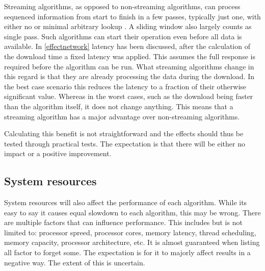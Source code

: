\documentclass[11pt,a4paper]{report}
\begin{document}
Streaming algorithms, as opposed to non-streaming algorithms, can process sequenced information from start to finish in a few passes, typically just one, with either no or minimal arbitrary lookup \cite{streamalg}. A sliding window also largely counts as single pass. Such algorithms can start their operation even before all data is available. In \ref{effectnetwork} latency has been discussed, after the calculation of the download time a fixed latency was applied. This assumes the full response is required before the algorithm can be run. What streaming algorithms change in this regard is that they are already processing the data during the download. In the best case scenario this reduces the latency to a fraction of their otherwise significant value. Whereas in the worst cases, such as the download being faster than the algorithm itself, it does not change anything. This means that a streaming algorithm has a major advantage over non-streaming algorithms.

Calculating this benefit is not straightforward and the effects should thus be tested through practical tests. The expectation is that there will be either no impact or a positive improvement.

\subsection{System resources}

System resources will also affect the performance of each algorithm. While its easy to say it causes equal slowdown to each algorithm, this may be wrong. There are multiple factors that can influence performance. This includes but is not limited to: processor spreed, processor cores, memory latency, thread scheduling, memory capacity, processor architecture, etc. It is almost guaranteed when listing all factor to forget some. The expectation is for it to majorly affect results in a negative way. The extent of this is uncertain.


\end{document}
